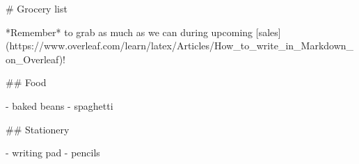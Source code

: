 \documentclass{article}
\begin{document}
\begin{markdown}
# Grocery list

*Remember* to grab as much as we can during upcoming [sales](https://www.overleaf.com/learn/latex/Articles/How_to_write_in_Markdown_on_Overleaf)!

## Food

- baked beans
- spaghetti

## Stationery 

- writing pad
- pencils
\end{markdown}
\end{document}
